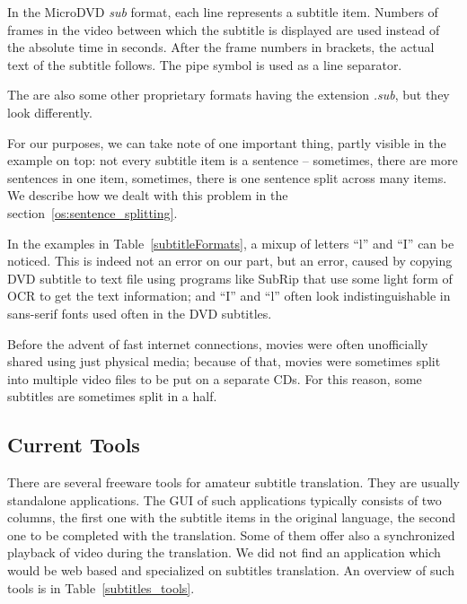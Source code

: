 In the MicroDVD \emph{sub} format, each line represents a subtitle item. Numbers of frames in the video between which the subtitle is displayed are used instead of the absolute time in seconds. After the frame numbers in brackets, the actual text of the subtitle follows. The pipe symbol is used as a line separator.

The are also some other proprietary formats having the extension \emph{.sub}, but they look differently.

For our purposes, we can take note of one important thing, partly visible in the example on top: not every subtitle item is a sentence -- sometimes, there are more sentences in one item, sometimes, there is one sentence split across many items. We describe how we dealt with this problem in the section~\ref{os:sentence_splitting}.

In the examples in Table~\ref{subtitleFormats}, a mixup of letters ``l'' and ``I'' can be noticed. This is indeed not an error on our part, but an error, caused by copying DVD subtitle to text file using programs like SubRip that use some light form of OCR to get the text information; and ``I'' and ``l'' often look indistinguishable in sans-serif fonts used often in the DVD subtitles.

Before the advent of fast internet connections, movies were often unofficially shared using just physical media; because of that, movies were sometimes split into multiple video files to be put on a separate CDs. For this reason, some subtitles are sometimes split in a half.

\subsection{Current Tools}

There are several freeware tools for amateur subtitle translation. They are usually standalone applications. The GUI of such applications typically consists of two columns, the first one with the subtitle items in the original language, the second one to be completed with the translation. Some of them offer also a synchronized playback of video during the translation. We did not find an application which would be web based and specialized on subtitles translation. An overview of such tools is in Table~\ref{subtitles_tools}.

